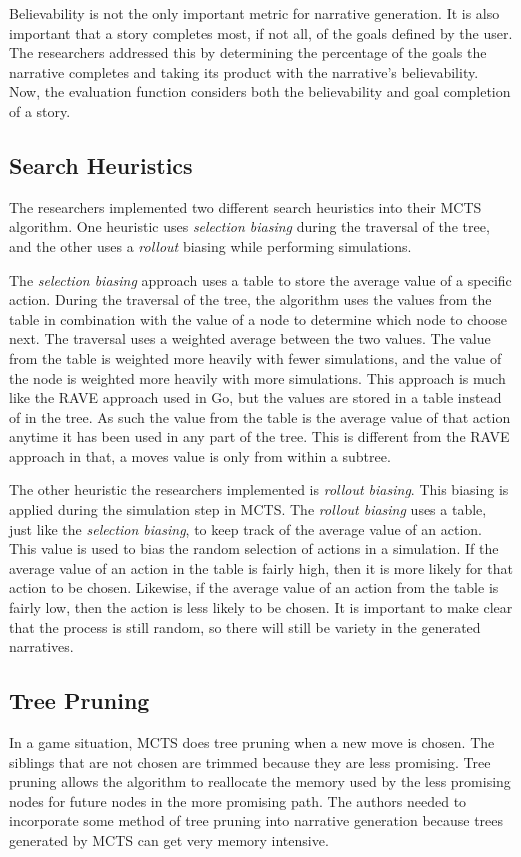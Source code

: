 \documentclass{sig-alternate}
\begin{document}
Believability is not the only important metric for narrative generation. It is also important that a story completes most, if not all, of the goals defined by the user. The researchers addressed this by determining the percentage of the goals the narrative completes and taking its product with the narrative's believability. Now, the evaluation function considers both the believability and goal completion of a story. 

\subsection{Search Heuristics}
The researchers implemented two different search heuristics into their MCTS algorithm. One heuristic uses \textit{selection biasing} during the traversal of the tree, and the other uses a \textit{rollout} biasing while performing simulations.

The \textit{selection biasing} approach uses a table to store the average value of a specific action. During the traversal of the tree, the algorithm uses the values from the table in combination with the value of a node to determine which node to choose next. The traversal uses a weighted average between the two values. The value from the table is weighted more heavily with fewer simulations, and the value of the node is weighted more heavily with more simulations. This approach is much like the RAVE approach used in Go, but the values are stored in a table instead of in the tree. As such the value from the table is the average value of that action anytime it has been used in any part of the tree. This is different from the RAVE approach in that, a moves value is only from within a subtree.

The other heuristic the researchers implemented is \textit{rollout biasing}. This biasing is applied during the simulation step in MCTS. The \textit{rollout biasing} uses a table, just like the \textit{selection biasing}, to keep track of the average value of an action. This value is used to bias the random selection of actions in a simulation. If the average value of an action in the table is fairly high, then it is more likely for that action to be chosen. Likewise, if the average value of an action from the table is fairly low, then the action is less likely to be chosen. It is important to make clear that the process is still random, so there will still be variety in the generated narratives.

\subsection{Tree Pruning}
In a game situation, MCTS does tree pruning when a new move is chosen. The siblings that are not chosen are trimmed because they are less promising. Tree pruning allows the algorithm to reallocate the memory used by the less promising nodes for future nodes in the more promising path. The authors needed to incorporate some method of tree pruning into narrative generation because trees generated by MCTS can get very memory intensive.
\end{document}
